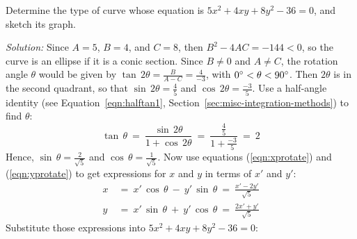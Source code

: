 \begin{exmp}\label{exmp:erotate2}
\noindent Determine the type of curve whose equation is $5x^2+4xy+8y^2-36=0$,
and sketch its graph.\vspace{1mm}
\par\noindent\emph{Solution:} Since $A=5$, $B=4$, and $C=8$, then
$B^2-4AC = -144 < 0$, so the curve is an ellipse if it is a conic
section. Since $B \ne 0$ and $A \ne C$, the rotation angle $\theta$ would
be given by $\tan\,2\theta = \frac{B}{A-C} = \frac{4}{-3}$, with
$0^\circ < \theta < 90^\circ$. Then $2\theta$ is in the second quadrant, so
that $\sin\,2\theta = \frac{4}{5}$ and $\cos\,2\theta = \frac{-3}{5}$. Use a
half-angle identity (see Equation~\ref{eqn:halftan1}, Section~\ref{sec:misc-integration-methods}) to find $\theta$:
\[
\tan\,\theta ~=~ \frac{\sin\,2\theta}{1 + \cos\,2\theta} ~=~
\frac{\frac{4}{5}}{1 + \frac{-3}{5}} ~=~ 2
\]
Hence, $\sin\,\theta=\frac{2}{\sqrt{5}}$ and $\cos\,\theta=\frac{1}{\sqrt{5}}$.
Now use equations (\ref{eqn:xprotate}) and (\ref{eqn:yprotate}) to get
expressions for $x$ and $y$ in terms of $x'$ and $y'$:
\begin{align*}
x ~&=~ x'\,\cos\,\theta ~-~ y'\,\sin\,\theta ~=~ \frac{x' - 2y'}{\sqrt{5}}\\[3pt]
y ~&=~ x'\,\sin\,\theta ~+~ y'\,\cos\,\theta ~=~ \frac{2x' + y'}{\sqrt{5}}
\end{align*}
\newpage
{}
\noindent Substitute those expressions into $5x^2+4xy+8y^2-36=0$:
\begin{align*}

\end{align*}
\end{exmp}
